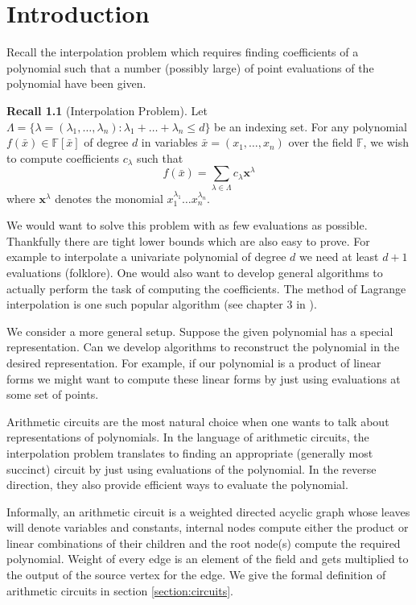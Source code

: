 \documentclass[12pt]{caltech_thesis}
\theoremstyle{plain}
\theoremstyle{definition}
\newtheorem{recall}{Recall}
\newcommand{\F}{\mathbb{F}}
\newcommand{\B}[1]{\bar{#1}}
\begin{document}
\tableofcontents

\mainmatter

\chapter{Introduction}\label{chapter:introduction}

Recall the interpolation problem which requires finding coefficients of a polynomial such that 
a number (possibly large) of point evaluations of the polynomial have been given.
\begin{recall}[Interpolation Problem]

Let $\Lambda = \{\lambda = (\lambda_1,\ldots,\lambda_n) : \lambda_1+\ldots+\lambda_n \leq d\}$ be an 
indexing set. For any polynomial $f(\B{x}) \in \F[\B{x}]$ of degree $d$ in variables $\B{x} = (x_1,\ldots,x_n)$ over the field $\F$,
 we wish to compute coefficients $c_{\lambda}$ such that 
 \[
  f(\B{x}) = \sum\limits_{\lambda\in \Lambda}c_{\lambda}\mathbf{x}^\lambda
 \]
where $\mathbf{x}^{\lambda}$ denotes the monomial $x_1^{\lambda_1}\ldots x_n^{\lambda_n}$.
\end{recall}

We would want to solve this problem with as few evaluations as possible. Thankfully there are tight lower bounds
which are also easy to prove. For example to interpolate a univariate polynomial of degree $d$ we need at least $d+1$
evaluations (folklore). One would also want to develop general algorithms to actually perform the task of computing the coefficients.
The method of Lagrange interpolation is one such popular algorithm (see chapter $3$ in \cite{Hildebrand87}).

We consider a more general setup. Suppose the given polynomial has a special representation. Can we develop algorithms 
to reconstruct the polynomial in the desired representation. For example, if our polynomial is a product of linear forms
we might want to compute these linear forms by just using evaluations at some set of points.

Arithmetic circuits are the most natural choice when one wants to talk about representations of polynomials. 
In the language of arithmetic circuits, the interpolation problem translates to finding an appropriate (generally most succinct) circuit 
by just using evaluations of the polynomial. In the reverse direction, they also provide efficient ways to evaluate the polynomial. 

Informally, an arithmetic circuit is a weighted directed acyclic graph whose leaves will denote variables and constants, 
internal nodes compute either the product or linear combinations of their children and the root node(s) compute the required polynomial.
Weight of every edge is an element of the field and gets multiplied to the output of the source vertex for the edge.
We give the formal definition of arithmetic circuits in section \ref{section:circuits}. 
\end{document}
